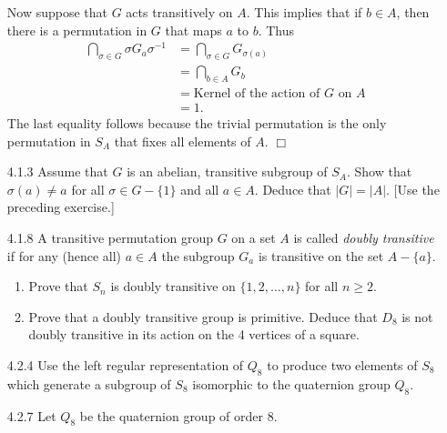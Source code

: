 \documentclass[9pt]{article}
\newcommand{\qed}{\hfill \ensuremath{\Box}}
\begin{document}
\begin{enumerate}
      Now suppose that $G$ acts transitively on $A$. This implies that if
      $b \in A$, then there is a permutation in $G$ that maps $a$ to $b$. Thus
      \begin{align*}
         \bigcap_{\sigma \in G}\sigma G_a\sigma^{-1} &=
            \bigcap_{\sigma \in G} G_{\sigma(a)} \\
            &= \bigcap_{b \in A} G_b \\
            &= \text{Kernel of the action of $G$ on $A$} \\
            &= 1.
      \end{align*}
      The last equality follows because the trivial permutation is the only
      permutation in $S_A$ that fixes all elements of $A$. \qed
   \item[4.1.3]   Assume that $G$ is an abelian, transitive subgroup of $S_A$.
                  Show that $\sigma(a) \neq a$ for all $\sigma \in G - \{1\}$
                  and all $a \in A$. Deduce that $|G| = |A|$. [Use the preceding
                  exercise.]
   \item[4.1.8]   A transitive permutation group $G$ on a set $A$ is called
                  \textit{doubly transitive} if for any (hence all) $a \in A$
                  the subgroup $G_a$ is transitive on the set $A - \{a\}$.
                  \begin{enumerate}
                     \item Prove that $S_n$ is doubly transitive on
                           $\{1, 2, \ldots, n\}$ for all $n \ge 2$.
                     \item Prove that a doubly transitive group is primitive.
                           Deduce that $D_8$ is not doubly transitive in its
                           action on the 4 vertices of a square.
                  \end{enumerate}
   \item[4.2.4]   Use the left regular representation of $Q_8$ to produce two
                  elements of $S_8$ which generate a subgroup of $S_8$
                  isomorphic to the quaternion group $Q_8$.
   \item[4.2.7]   Let $Q_8$ be the quaternion group of order 8.
                  \begin{enumerate}

\end{enumerate}
\end{enumerate}
\end{document}
